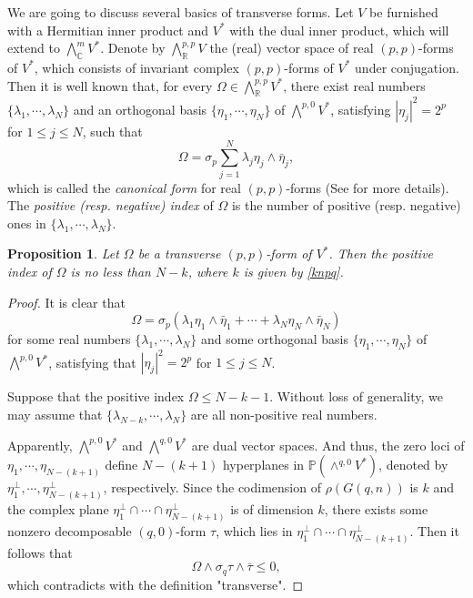 \documentclass[12pt]{amsart}
\numberwithin{equation}{section}
\newtheorem{proposition}[theorem]{Proposition}
\renewcommand{\1}{\mathds{1}}
\renewcommand{\>}{\rightarrow}
\begin{document}
We are going to discuss several basics of transverse forms.
Let $V$ be furnished with a Hermitian inner product and $V^*$ with
the dual inner product, which will extend to
$\bigwedge^{m}_{\mathbb{C}}V^*$.
Denote by $\bigwedge^{p,p}_{\mathbb{R}}V$ the (real) vector space of
real $(p,p)$-forms of $V^*$, which consists of invariant complex
$(p,p)$-forms of $V^*$ under conjugation. Then it is well known that, for
every $\Omega\in \bigwedge^{p,p}_{\mathbb{R}}V^*$, there exist real
numbers $\{\lambda_1,\cdots,\lambda_N\}$ and an orthogonal basis
$\{\eta_1,\cdots,\eta_N\}$ of $\bigwedge^{p,0}V^*$, satisfying
$|\eta_j|^2=2^p$ for $1 \leq j \leq N$, such that
$$\Omega=\sigma_p\sum_{j=1}^N\lambda_j\eta_j\wedge\bar{\eta}_j,$$
which is called the \emph{canonical form} for real $(p,p)$-forms (See
\cite{HK} for more details). The \emph{positive (resp. negative) index} of
$\Omega$ is the number of positive (resp. negative) ones in
$\{\lambda_1,\cdots,\lambda_N\}$.


\begin{proposition}
Let $\Omega$ be a transverse $(p,p)$-form of $V^*$. Then the positive index
of $\Omega$ is no less than $N-k$, where $k$ is given by
\eqref{knpq}.
\end{proposition}
\begin{proof}
It is clear that
$$\Omega=\sigma_p(\lambda_1\eta_1\wedge\bar\eta_1+\cdots+\lambda_N\eta_N\wedge\bar\eta_N)$$
for some real numbers $\{\lambda_1,\cdots,\lambda_N\}$ and some
orthogonal basis $\{\eta_1,\cdots,\eta_N\}$ of $\bigwedge^{p,0}V^*$,
satisfying that $|\eta_j|^2=2^p$ for $1 \leq j \leq N$.

Suppose that the positive index $\Omega\leq N-k-1$. Without loss of
generality, we may assume that $\{\lambda_{N-k},\cdots,\lambda_N\}$
are all non-positive real numbers.

Apparently, $\bigwedge^{p,0}V^*$ and $\bigwedge^{q,0}V^*$ are dual
vector spaces. And thus, the zero loci of $\eta_1,\cdots,\eta_{N-(k+1)}$
define $N-(k+1)$ hyperplanes in $\mathbb{P}(\wedge^{q,0}V^*)$, denoted by
$\eta_1^\perp,\cdots,\eta_{N-(k+1)}^\perp$, respectively.
Since the codimension of $\rho(G(q,n))$ is $k$ and the complex plane
$\eta_1^\perp\cap\cdots\cap\eta_{N-(k+1)}^\perp$ is of dimension
$k$, there exists some nonzero decomposable
$(q,0)$-form $\tau$, which lies in
$\eta_1^\perp\cap\cdots\cap\eta_{N-(k+1)}^\perp$. Then it follows
that
$$\Omega\wedge\sigma_{q}\tau\wedge\bar\tau\leq 0,$$
which contradicts with the definition "transverse".
\end{proof}
\end{document}
